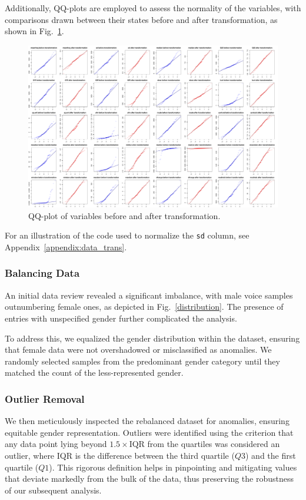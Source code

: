 \documentclass{article}
\begin{document}
	Additionally, QQ-plots are employed to assess the normality of the variables, with comparisons drawn between their states before and after transformation, as shown in Fig.~\ref{transformation_qq}.
	\begin{figure}
		\centering
		\includegraphics[width=\textwidth]{graphs/transformations_qq.pdf}
		\caption{QQ-plot of variables before and after transformation.}
		\label{transformation_qq}
	\end{figure}
	
	For an illustration of the code used to normalize the \texttt{sd} column, see Appendix~\ref{appendix:data_trans}.	
	
	\subsubsection{Balancing Data}
	
	An initial data review revealed a significant imbalance, with male voice samples outnumbering female ones, as depicted in Fig.~\ref{distribution}. The presence of entries with unspecified gender further complicated the analysis.
	
	To address this, we equalized the gender distribution within the dataset, ensuring that female data were not overshadowed or misclassified as anomalies. We randomly selected samples from the predominant gender category until they matched the count of the less-represented gender.
	
	\subsubsection{Outlier Removal}
	
	We then meticulously inspected the rebalanced dataset for anomalies, ensuring equitable gender representation. Outliers were identified using the criterion that any data point lying beyond $1.5 \times \text{IQR}$ from the quartiles was considered an outlier, where IQR is the difference between the third quartile ($Q3$) and the first quartile ($Q1$). This rigorous definition helps in pinpointing and mitigating values that deviate markedly from the bulk of the data, thus preserving the robustness of our subsequent analysis.
	
\end{document}
